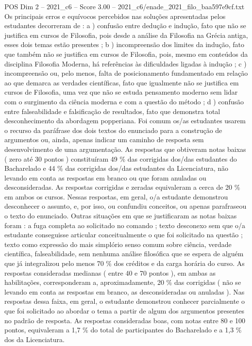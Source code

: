 \begin{textsample}{POS Dim 2 – 2021\_c6 – Score 3.00 – 2021\_c6/enade\_2021\_filo\_baa597e9cf.txt}
Os principais erros e equívocos percebidos nas soluções apresentadas pelos estudantes decorreram de : a ) confusão entre dedução e indução, fato que não se justifica em cursos de Filosofia, pois desde a análise da Filosofia na Grécia antiga, esses dois temas estão presentes ; b ) incompreensão dos limites da indução, fato que também não se justifica em cursos de Filosofia, pois, mesmo em conteúdos da disciplina Filosofia Moderna, há referências às dificuldades ligadas à indução ; c ) incompreensão ou, pelo menos, falta de posicionamento fundamentado em relação ao que demarca as verdades científicas, fato que igualmente não se justifica em cursos de Filosofia, uma vez que não se estuda pensamento moderno sem lidar com o surgimento da ciência moderna e com a questão do método ; d ) confusão entre falseabilidade e falsificação de resultados, fato que demonstra total desconhecimento da abordagem popperiana.
Foi comum os/as estudantes usarem o recurso da paráfrase dos dois textos do enunciado para a construção de argumentos ou, ainda, apenas indicar um caminho de resposta sem desenvolvimento de uma argumentação.
As respostas que obtiveram notas baixas ( zero até 30 pontos ) constituíram 49 \% das corrigidas dos/das estudantes do Bacharelado e 44 \% das corrigidas dos/das estudantes da Licenciatura, não levando em conta as respostas em branco ou que foram anuladas ou desconsideradas.
As respostas corrigidas e zeradas equivaleram a cerca de 20 \% em ambos os cursos.
Nessas respostas, em geral, o/a estudante demonstrou desconhecer o assunto, e, por isso, ou confundiu conceitos, ou apenas parafraseou o texto do enunciado.
Outras situações em que se justificaram as notas baixas foram : a fuga completa ao solicitado no comando ; texto desconexo sem que o/a estudante conseguisse articular conceitualmente o que foi solicitado na questão ; texto como expressão do mais simplório senso comum sobre ciência, verdade científica, falseabilidade, sem nenhuma análise filosófica que se espera de alguém que já integralizou pelo menos 70 \% dos créditos e da carga horária do curso.
As respostas consideradas medianas ( entre 40 e 70 pontos ), em ambas as habilitações, corresponderam a, aproximadamente, 20 \% das corrigidas ( não se levando em conta as respostas em branco, as desconsideradas ou anuladas ).
Nas respostas dessa faixa, em geral, o estudante demonstrou conhecer parcialmente o que foi solicitado ao abordar o tema a partir de algum dos argumentos presentes no padrão de resposta.
As respostas consideradas boas, com notas entre 80 e 100 pontos, equivaleram a 1,7 \% do total de participantes do Bacharelado e a 1,3 \% dos da Licenciatura.

\end{textsample}
